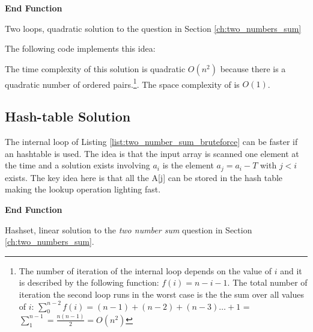 \begin{algorithm}
	\SetAlgoLined
	

	\textbf{End Function}
	
	\label{algo:two_number_sum_bruteforce}
	\caption{Two loops, quadratic solution to the question in Section \ref{ch:two_numbers_sum} }
\end{algorithm}
The following code implements this idea:



The time complexity of this solution is quadratic $O(n^2)$ because there is a quadratic number of ordered pairs.\footnote{The number of iteration of the internal loop depends on the value of $i$ and it is described by the following function: $f(i) = n-i-1$. The total number of iteration the second loop runs in the worst case is the the sum over all values of $i$: $\sum_{0}^{n-2}f(i) = (n-1) + (n-2) + (n-3) \dots + 1$ = $\sum_{1}^{n-1} = \frac{n(n-1)}{2} = O(n^2)$}. The space complexity of is $O(1)$.

\subsection{Hash-table Solution}
The internal loop of Listing \ref{list:two_number_sum_bruteforce} can be faster if an hashtable is used. The idea is that the input array is scanned one element at the time and a solution exists involving $a_i$ is the element $a_j  = a_i-T$ with $j < i$ exists. The key idea here is that all the A[j] can be stored in the hash table making the lookup operation lighting fast. 

\begin{algorithm}
	
    \textbf{End Function}

	\label{algo:two_number_sum_hashset}
	\caption{Hashset, linear solution to the \textit{two number sum} question in Section \ref{ch:two_numbers_sum}.}
\end{algorithm}


